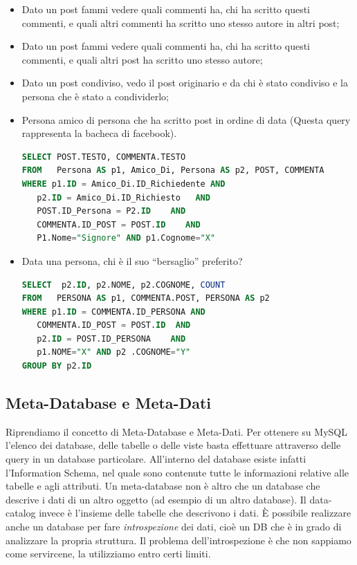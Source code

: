 \begin{itemize}
\item Dato un post fammi vedere quali commenti ha, chi ha scritto questi commenti, e quali altri commenti ha scritto uno stesso autore in altri post;
\item Dato un post fammi vedere quali commenti ha, chi ha scritto questi commenti, e quali altri post ha scritto uno stesso autore;
\item Dato un post condiviso, vedo il post originario e da chi è stato condiviso e la persona che è stato a condividerlo;
\item Persona amico di persona che ha scritto post in ordine di data (Questa query rappresenta la bacheca di facebook). 

\begin{lstlisting}[language=SQL]
SELECT POST.TESTO, COMMENTA.TESTO 
FROM   Persona AS p1, Amico_Di, Persona AS p2, POST, COMMENTA 
WHERE p1.ID = Amico_Di.ID_Richiedente AND    
   p2.ID = Amico_Di.ID_Richiesto   AND   
   POST.ID_Persona = P2.ID    AND   
   COMMENTA.ID_POST = POST.ID    AND   
   P1.Nome="Signore" AND p1.Cognome="X" 
\end{lstlisting}

\item Data una persona, chi è il suo “bersaglio” preferito? 

\begin{lstlisting}[language=SQL]
SELECT  p2.ID, p2.NOME, p2.COGNOME, COUNT 
FROM   PERSONA AS p1, COMMENTA.POST, PERSONA AS p2 
WHERE p1.ID = COMMENTA.ID_PERSONA AND
   COMMENTA.ID_POST = POST.ID  AND   
   p2.ID = POST.ID_PERSONA    AND   
   p1.NOME="X" AND p2 .COGNOME="Y"
GROUP BY p2.ID
\end{lstlisting}

\end{itemize}

\subsection{Meta-Database e Meta-Dati}

Riprendiamo il concetto di Meta-Database e Meta-Dati. Per ottenere su MySQL l’elenco dei database, delle tabelle o delle viste basta effettuare attraverso delle query in un database particolare. All’interno del database esiste infatti l’Information Schema, nel quale sono contenute tutte le informazioni relative alle tabelle e agli attributi.  Un meta-database non è altro che un database che descrive i dati di un altro oggetto (ad esempio di un altro database). Il data-catalog invece è l’insieme delle tabelle che descrivono i dati. È possibile realizzare anche un database per fare \textit{introspezione} dei dati, cioè un DB che è in grado di analizzare la propria struttura. Il problema dell’introspezione è che non sappiamo come servircene, la utilizziamo entro certi limiti.  


